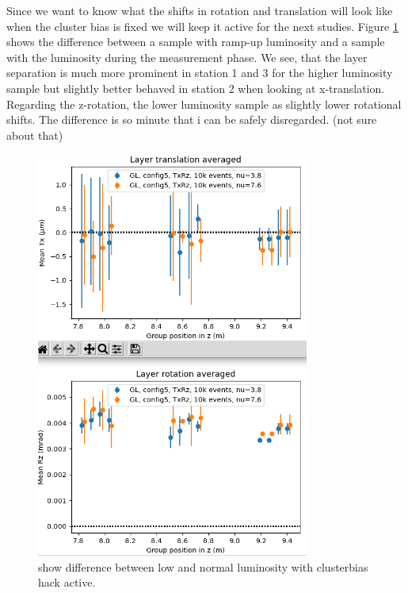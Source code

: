 Since we want to know what the shifts in rotation and translation will look like when the cluster bias is fixed we will keep it active for the next studies.
Figure \ref{fig:lumi_low_normal_hack_on} shows the difference between a sample with ramp-up luminosity and a sample with the luminosity during the measurement phase.
We see, that the layer separation is much more prominent in station 1 and 3 for the higher luminosity sample but slightly better behaved in station 2 when looking at x-translation.
Regarding the z-rotation, the lower luminosity sample as slightly lower rotational shifts.
The difference is so minute that i can be safely disregarded. (not sure about that)

\begin{figure}
  \centering
  \includegraphics[width=0.8\textwidth]{plots/jan_24_2022/low_normal_with_hack.png}
  \caption{show difference between low and normal luminosity with clusterbias hack active.}
  \label{fig:lumi_low_normal_hack_on}
\end{figure}




